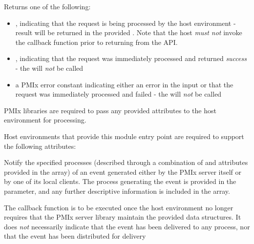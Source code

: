 Returns one of the following:

\begin{itemize}
    \item {}, indicating that the request is being processed by the host environment - result will be returned in the provided . Note that the host \emph{must not} invoke the callback function prior to returning from the \ac{API}.
    \item {}, indicating that the request was immediately processed and returned \textit{success} - the  will \textit{not} be called
    \item a PMIx error constant indicating either an error in the input or that the request was immediately processed and failed - the  will \textit{not} be called
\end{itemize}

\reqattrstart
\ac{PMIx} libraries are required to pass any provided attributes to the host environment for processing.

\divider

Host environments that provide this module entry point are required to support the following attributes:


\reqattrend

\descr

Notify the specified processes (described through a combination of  and attributes provided in the  array) of an event generated either by the \ac{PMIx} server itself or by one of its local clients.
The process generating the event is provided in the  parameter, and any further descriptive information is
included in the  array.

\advicermstart
The callback function is to be executed once the host environment no longer requires that the \ac{PMIx} server library maintain the provided data structures. It does \emph{not} necessarily indicate that the event has been delivered to any process, nor that the event has been distributed for delivery
\advicermend


\subsection{}

